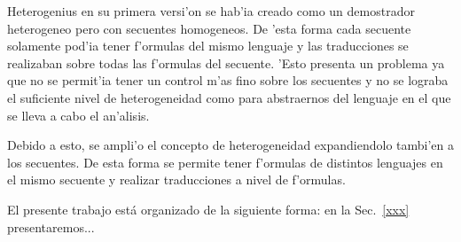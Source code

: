 \begin{itemize}
Heterogenius en su primera versi'on se hab'ia creado como un demostrador heterogeneo pero con secuentes homogeneos. De 'esta forma cada secuente solamente pod'ia tener f'ormulas del mismo lenguaje y las traducciones se realizaban sobre todas las f'ormulas del secuente. 'Esto presenta un problema ya que no se permit'ia tener un control m'as fino sobre los secuentes y no se lograba el suficiente nivel de heterogeneidad como para abstraernos del lenguaje en el que se lleva a cabo el an'alisis.

Debido a esto, se ampli'o el concepto de heterogeneidad expandiendolo tambi'en a los secuentes. De esta forma se permite tener f'ormulas de distintos lenguajes en el mismo secuente y realizar traducciones a nivel de f'ormulas.

\end{itemize}

El presente trabajo está organizado de la siguiente forma: en la Sec.~\ref{xxx} presentaremos...